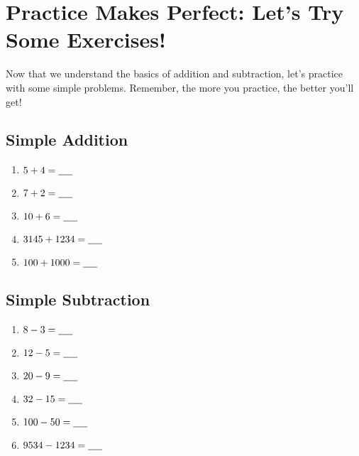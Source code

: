 \section{Practice Makes Perfect: Let’s Try Some Exercises!}
Now that we understand the basics of addition and subtraction, let’s practice with some simple problems. Remember, the more you practice, the better you’ll get!
\begin{multicols}{2}
    

\subsection{Simple Addition}
    \begin{enumerate}[label=\alph*)]
        \item $5 + 4 = \underline{\hspace{0.5cm}}$
        \item $7 + 2 = \underline{\hspace{0.5cm}}$
        \item $10 + 6 = \underline{\hspace{0.5cm}}$
        \item $3145 + 1234 = \underline{\hspace{0.5cm}}$
        \item $100 + 1000 = \underline{\hspace{0.5cm}}$
    \end{enumerate}

    \subsection{Simple Subtraction}
    \begin{enumerate}[label=\alph*)]
        \item $8 - 3 = \underline{\hspace{0.5cm}}$
        \item $12 - 5 = \underline{\hspace{0.5cm}}$
        \item $20 - 9 = \underline{\hspace{0.5cm}}$
        \item $32 - 15 = \underline{\hspace{0.5cm}}$
        \item $100 - 50 = \underline{\hspace{0.5cm}}$
        \item $9534 - 1234 = \underline{\hspace{0.5cm}}$
    \end{enumerate}
\end{multicols}

